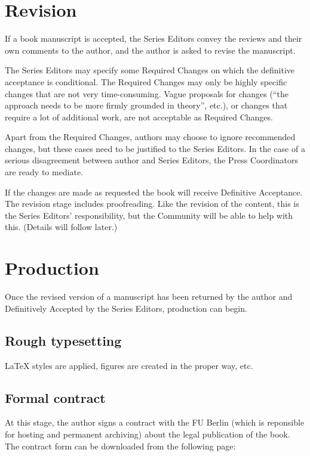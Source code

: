 \documentclass[ number=??
                ,series=lnls,
                ,isbn=000-0-000000-00-0,
                ,url=http://langsci-press.org/catalog/book/0,
	        ,output=long    %
	        ,draftmode  
		  ]{LSP/langsci}
\begin{document}
\section{Revision}

If a book manuscript is accepted, the Series Editors convey the reviews and their own comments to
the author, and the author is asked to revise the manuscript.

The Series Editors may specify some Required Changes on which the definitive acceptance is
conditional. The Required Changes may only be highly specific changes that are not very
time-consuming. Vague proposals for changes (``the approach needs to be more firmly grounded in
theory'', etc.), or changes that require a lot of additional work, are not acceptable as Required Changes.

Apart from the Required Changes, authors may choose to ignore recommended changes, but these cases
need to be justified to the Series Editors. In the case of a serious disagreement between author and
Series Editors, the Press Coordinators are ready to mediate.

If the changes are made as requested the book will receive Definitive Acceptance.  The revision
stage includes proofreading. Like the revision of the content, this is the Series Editors'
responsibility, but the \lsp Community will be able to help with this. (Details will follow later.)

\section{Production}

Once the revised version of a manuscript has been returned by the author and Definitively Accepted
by the Series Editors, production can begin.

\subsection{Rough typesetting}

LaTeX styles are applied, figures are created in the proper way, etc.

\subsection{Formal contract}

At this stage, the author signs a contract with the FU Berlin (which is reponsible for hosting and permanent archiving) about the legal publication of the book. The contract form can be downloaded from the following page:
\end{document}
